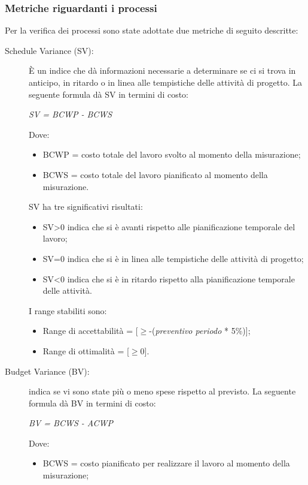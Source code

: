    \subsubsection{Metriche riguardanti i processi}
    Per la verifica dei processi sono state adottate due metriche di seguito descritte:
    \begin{description}
      \item[Schedule Variance (SV):] È un indice che dà informazioni necessarie a determinare se ci si trova in anticipo,
      in ritardo o in linea alle tempistiche delle attività di progetto.
      La seguente formula dà SV in termini di costo:
      \begin{center}
        \emph{SV = BCWP - BCWS}
      \end{center}
      Dove:
      \begin{itemize}
        \item BCWP = costo totale del lavoro svolto al momento della misurazione;
        \item BCWS = costo totale del lavoro pianificato al momento della misurazione.
      \end{itemize}
      SV ha tre significativi risultati:
      \begin{itemize}
        \item SV>0 indica che si è avanti rispetto alle pianificazione temporale del lavoro;
        \item SV=0 indica che si è in linea alle tempistiche delle attività di progetto;
        \item SV<0 indica che si è in ritardo rispetto alla pianificazione temporale delle attività.
      \end{itemize}
      I range stabiliti sono:
      \begin{itemize}
        \item Range di accettabilità = [\(\geq\)-(\emph{preventivo periodo} * 5\%)];
        \item Range di ottimalità = [\(\geq\)0].
      \end{itemize}
      \item[Budget Variance (BV):] indica se vi sono state più o meno spese rispetto al previsto.
      La seguente formula dà BV in termini di costo:
      \begin{center}
        \emph{BV = BCWS - ACWP}
      \end{center}
      Dove:
      \begin{itemize}
        \item BCWS = costo pianificato per realizzare il lavoro al momento della misurazione;

\end{itemize}
\end{description}
